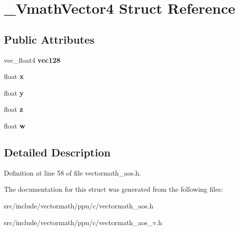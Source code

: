 \hypertarget{struct__VmathVector4}{\section{\-\_\-\-Vmath\-Vector4 Struct Reference}
\label{struct__VmathVector4}
}
\subsection*{Public Attributes}
\begin{DoxyCompactItemize}
\item 
\hypertarget{struct__VmathVector4_abf6000c4af358cfc99318f2621d600ca}{vec\-\_\-float4 {\bfseries vec128}}\label{struct__VmathVector4_abf6000c4af358cfc99318f2621d600ca}

\item 
\hypertarget{struct__VmathVector4_a96a079668fb45fadde5fcc2e3e8b3bc6}{float {\bfseries x}}\label{struct__VmathVector4_a96a079668fb45fadde5fcc2e3e8b3bc6}

\item 
\hypertarget{struct__VmathVector4_a6f60c4d7dd212e85bc299b622f74eee9}{float {\bfseries y}}\label{struct__VmathVector4_a6f60c4d7dd212e85bc299b622f74eee9}

\item 
\hypertarget{struct__VmathVector4_a1480016f839d33dc7f4ac71afd4089ea}{float {\bfseries z}}\label{struct__VmathVector4_a1480016f839d33dc7f4ac71afd4089ea}

\item 
\hypertarget{struct__VmathVector4_a1f7c514062c6c35e7200a55b98824409}{float {\bfseries w}}\label{struct__VmathVector4_a1f7c514062c6c35e7200a55b98824409}

\end{DoxyCompactItemize}


\subsection{Detailed Description}


Definition at line 58 of file vectormath\-\_\-aos.\-h.



The documentation for this struct was generated from the following files\-:\begin{DoxyCompactItemize}
\item 
src/include/vectormath/ppu/c/vectormath\-\_\-aos.\-h\item 
src/include/vectormath/ppu/c/vectormath\-\_\-aos\-\_\-v.\-h\end{DoxyCompactItemize}
